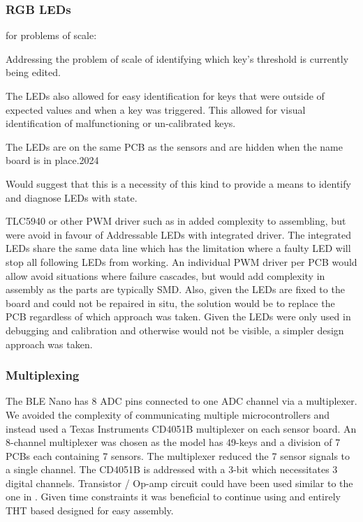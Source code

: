 \subsubsection{RGB LEDs}\label{rgb-leds}

for problems of scale:

Addressing the problem of scale of identifying which key's threshold is
currently being edited.

The LEDs also allowed for easy identification for keys that were outside
of expected values and when a key was triggered. This allowed for visual
identification of malfunctioning or un-calibrated keys.

The LEDs are on the same PCB as the sensors and are hidden when the
name board is in place.2024

Would suggest that this is a necessity of this kind to provide a means
to identify and diagnose LEDs with state.

TLC5940 or other PWM driver such as in \cite{McPherson2013} added
complexity to assembling, but were avoid in favour of Addressable LEDs
with integrated driver. The integrated LEDs share the same data line
which has the limitation where a faulty LED will stop all following LEDs
from working. An individual PWM driver per PCB would allow avoid
situations where failure cascades, but would add complexity in assembly
as the parts are typically SMD. Also, given the LEDs are fixed to the
board and could not be repaired in situ, the solution would be to
replace the PCB regardless of which approach was taken. Given the LEDs
were only used in debugging and calibration and otherwise would not be
visible, a simpler design approach was taken.

\subsubsection{Multiplexing}\label{multiplexing}


The BLE Nano has 8 ADC pins connected to one ADC channel via a multiplexer. 
We avoided the complexity of communicating multiple microcontrollers and instead used a Texas Instruments CD4051B multiplexer on each sensor board.
An 8-channel multiplexer was chosen as the model has 49-keys and a division of 7 PCBs each containing 7 sensors.
The multiplexer reduced the 7 sensor signals to a single channel. The CD4051B is addressed with a 3-bit which necessitates 3 digital channels.
Transistor / Op-amp circuit could have been used similar to the one in
\cite{McPherson2013}. Given time constraints it was beneficial to continue using and entirely THT based designed for easy assembly.

